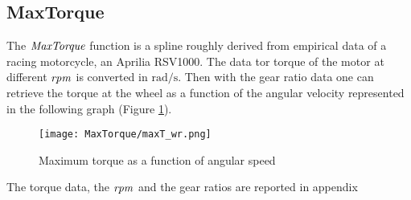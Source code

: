\subsection{MaxTorque}
%
The ${\it MaxTorque}$ function is a spline roughly derived from empirical data of a racing motorcycle, an Aprilia RSV1000. The data tor torque of the motor at different $\it rpm$ is converted in $\si{\radian/\second}$. Then with the gear ratio data one can retrieve the torque at the wheel as a function of the angular velocity represented in the following graph (Figure \ref{fig:MaxTorque}).\\
%
\begin{figure}[htb]
    \centering
    \texttt{[image: MaxTorque/maxT\_wr.png]}
    \caption{Maximum torque as a function of angular speed}
    \label{fig:MaxTorque}
\end{figure}
%
The torque data, the $\it rpm$ and the gear ratios are reported in appendix 



